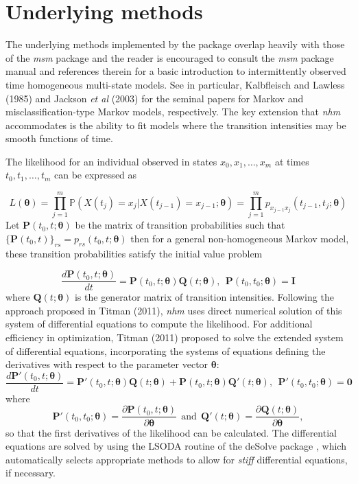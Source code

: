 \documentclass{article}
\numberwithin{equation}{section}
\begin{document}
\section{Underlying methods}

The underlying methods implemented by the package overlap heavily with those of the {\it msm} package \cite{jackson} and the reader is encouraged to consult the {\it msm} package manual and references therein for a basic introduction to intermittently observed time homogeneous multi-state models. See in particular, Kalbfleisch and Lawless (1985) \cite{kalbfleisch} and Jackson {\it et al} (2003) \cite{jackson2003} for the seminal papers for Markov and misclassification-type Markov models, respectively. The key extension that {\it nhm} accommodates is the ability to fit models where the transition intensities may be smooth functions of time.

The likelihood for an individual observed in states $x_0, x_1, \ldots, x_m$ at times $t_0, t_1, \ldots, t_m$ can be expressed as

$$L(\bm\theta) = \prod_{j=1}^{m} \mathbb{P}(X(t_j) = x_j | X(t_{j-1}) = x_{j-1} ; \bm\theta) = \prod_{j=1}^{m} p_{x_{j-1}x_j}(t_{j-1},t_j ; \bm\theta)$$
Let $\mathbf{P}(t_0, t ; \bm\theta)$ be the matrix of transition probabilities such that $\{\mathbf{P}(t_0, t)\}_{rs} = p_{rs}(t_0,t ; \bm\theta)$ then for a general non-homogeneous Markov model, these transition probabilities satisfy the initial value problem

$$\frac{d\mathbf{P}(t_0, t ; \bm\theta)}{dt} = \mathbf{P}(t_0, t ; \bm\theta)\mathbf{Q}(t ; \bm\theta), ~~ \mathbf{P}(t_0, t_0 ;\bm\theta) = \mathbf{I}$$
where $\mathbf{Q}(t ; \bm\theta)$ is the generator matrix of transition intensities. Following the approach proposed in Titman (2011), {\it nhm} uses direct numerical solution of this system of differential equations to compute the likelihood. For additional efficiency in optimization, Titman (2011) proposed to solve the extended system of differential equations, incorporating the systems of equations defining the derivatives with respect to the parameter vector $\bm\theta$:
$$\frac{d\mathbf{P}'(t_0, t ; \bm\theta)}{dt} = \mathbf{P}'(t_0, t ; \bm\theta)\mathbf{Q}(t ; \bm\theta) + \mathbf{P}(t_0, t ; \bm\theta)\mathbf{Q}'(t ; \bm\theta), ~~ \mathbf{P}'(t_0, t_0 ;\bm\theta) = \mathbf{0}$$
where $$\mathbf{P}'(t_0, t_0 ;\bm\theta) = \frac{\partial \mathbf{P}(t_0, t ; \bm\theta)}{\partial \bm\theta} ~~ \mbox{and} ~~ \mathbf{Q}'(t ; \bm\theta) = \frac{\partial \mathbf{Q}(t ; \bm\theta)}{\partial \bm\theta},$$
so that the first derivatives of the likelihood can be calculated. The differential equations are solved by using the LSODA routine \cite{lsoda} of the deSolve package \cite{deSolve}, which automatically selects appropriate methods to allow for {\it stiff} differential equations, if necessary.
\end{document}
